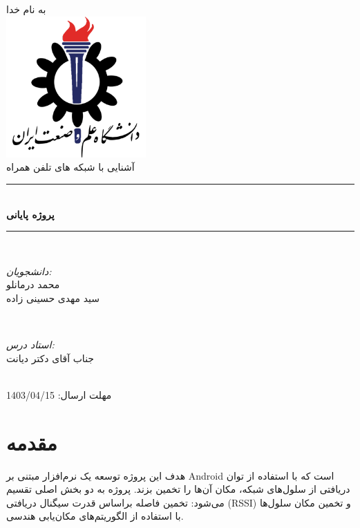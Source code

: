 \documentclass[11pt]{article}
\begin{document}
\begin{titlepage}

\newcommand{\HRule}{\rule{\linewidth}{0.5mm}}

\center 

\textsc{\LARGE به نام خدا}\\[1.5cm] 

\includegraphics[width=0.4\textwidth]{IUSTLogo.png}\\[2cm] 

\textsc{\Large آشنایی با شبکه های تلفن همراه}\\[0.5cm] 

\HRule \\[0.4cm]
{ \huge \bfseries پروژه پایانی}\\[0.4cm] 
\HRule \\[1.5cm]

\begin{minipage}{0.4\textwidth}
\begin{flushright} \large
\emph{دانشجویان:}\\
محمد درمانلو \\
سید مهدی حسینی زاده\\
\end{flushright}
\end{minipage}
~
\begin{minipage}{0.4\textwidth}
\begin{flushright} \large
\emph{استاد درس: } \\
جناب آقای دکتر دیانت  \\
\end{flushright}
\end{minipage}\\[2cm]

{\large مهلت ارسال: 1403/04/15}\\[2cm]
\vfill 
\end{titlepage}

\newpage

\section{مقدمه}
هدف این پروژه توسعه یک نرم‌افزار مبتنی بر Android است که با استفاده از توان دریافتی از سلول‌های شبکه، مکان آن‌ها را تخمین بزند. پروژه به دو بخش اصلی تقسیم می‌شود: تخمین فاصله براساس قدرت سیگنال دریافتی (RSSI) و تخمین مکان سلول‌ها با استفاده از الگوریتم‌های مکان‌یابی هندسی.
\end{document}
